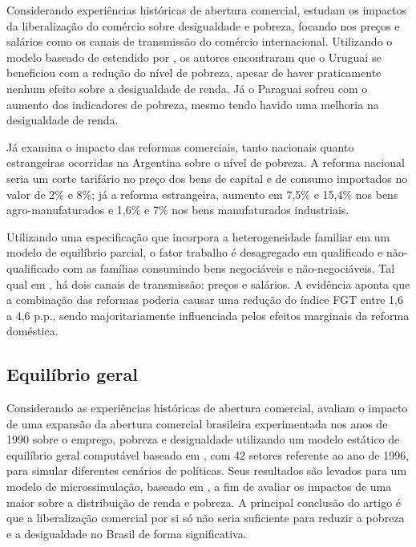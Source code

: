 Considerando experiências históricas de abertura comercial, \textcite{borrazetal12} estudam os impactos da liberalização do comércio sobre desigualdade e pobreza, focando nos preços e salários como os canais de transmissão do comércio internacional. Utilizando o modelo baseado de \textcite{dixit80} estendido por \textcite{porto06}, os autores encontraram que o Uruguai se beneficiou com a redução do nível de pobreza, apesar de haver praticamente nenhum efeito sobre a desigualdade de renda. Já o Paraguai sofreu com o aumento dos indicadores de pobreza, mesmo tendo havido uma melhoria na desigualdade de renda.

Já \textcite{porto03} examina o impacto das reformas comerciais, tanto nacionais quanto estrangeiras ocorridas na Argentina sobre o nível de pobreza. A reforma nacional seria um corte tarifário no preço dos bens de capital e de consumo importados no valor de 2\% e 8\%; já a reforma estrangeira, aumento em 7,5\% e 15,4\% nos bens agro-manufaturados e 1,6\% e 7\% nos bens manufaturados industriais.

Utilizando uma especificação que incorpora a heterogeneidade familiar em um modelo de equilíbrio parcial, o fator trabalho é desagregado em qualificado e não-qualificado com as famílias consumindo bens negociáveis e não-negociáveis. Tal qual em \textcite{borrazetal12}, há dois canais de transmissão: preços e salários. A evidência aponta que a combinação das reformas poderia causar uma redução do índice FGT entre 1,6 a 4,6 p.p., sendo majoritariamente influenciada pelos efeitos marginais da reforma doméstica.

\subsection{Equilíbrio geral} \label{subsec:eq_geral}

Considerando as experiências históricas de abertura comercial, \textcite{carneiro06} avaliam o impacto de uma expansão da abertura comercial brasileira experimentada nos anos de 1990 sobre o emprego, pobreza e desigualdade utilizando um modelo estático de equilíbrio geral computável baseado em \textcite{robinson99}, com 42 setores referente ao ano de 1996, para simular diferentes cenários de políticas. Seus resultados são levados para um modelo de microssimulação, baseado em \textcite{ganuza07}, a fim de avaliar os impactos de uma maior sobre a distribuição de renda e pobreza. A principal conclusão do artigo é que a liberalização comercial por si só não seria suficiente para reduzir a pobreza e a desigualdade no Brasil de forma significativa.

